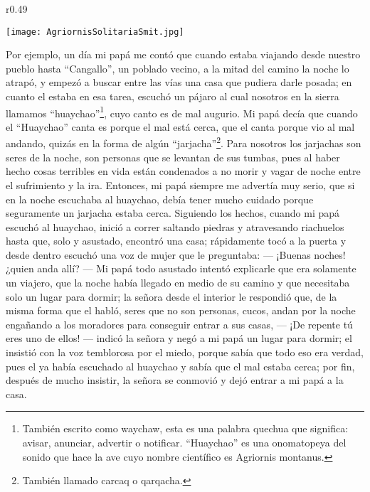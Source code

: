 \ifdefined\EnableIncludeImages
\begin{wrapfigure}{r}{0.49\textwidth}
  \begin{center}
  \vspace{-20pt}
    \texttt{[image: AgriornisSolitariaSmit.jpg]}
  \end{center}
  \vspace{-20pt}
\end{wrapfigure}
\fi
Por ejemplo, un día mi papá me contó que cuando estaba viajando desde nuestro pueblo hasta ``Cangallo'', un poblado vecino, a la mitad del camino la noche lo atrapó, y empezó a buscar entre las vías una casa que pudiera darle posada; en cuanto el estaba en esa tarea, escuchó un pájaro al cual nosotros en la sierra llamamos ``huaychao''\footnote{También escrito como waychaw, esta es una palabra quechua que significa: avisar, anunciar, advertir o notificar. ``Huaychao'' es una onomatopeya del sonido que hace la ave cuyo nombre científico es Agriornis montanus.}, cuyo canto es de mal augurio.
Mi papá decía que cuando el ``Huaychao'' canta es porque el mal está cerca, que el canta porque vio al mal andando, quizás en la forma de algún ``jarjacha''\footnote{También llamado carcaq o qarqacha.}. Para nosotros los jarjachas son seres de la noche, son personas que se levantan de sus tumbas, pues al haber hecho cosas terribles en vida están condenados a no morir y vagar de noche entre el sufrimiento y la ira.
Entonces, mi papá siempre me advertía muy serio, que si en la noche escuchaba al huaychao, debía tener mucho cuidado porque seguramente un jarjacha estaba cerca.
Siguiendo los hechos, cuando mi papá escuchó al huaychao, inició a correr saltando piedras y atravesando riachuelos hasta que, solo y asustado, encontró una casa; rápidamente tocó a la puerta y desde dentro escuchó una voz de mujer que le preguntaba: 
--- ¡Buenas noches! ¿quien anda allí? ---
Mi papá todo asustado intentó explicarle que era solamente un viajero, que la noche había llegado en medio de su camino y que necesitaba solo un lugar para dormir; la señora desde el interior le respondió que, de la misma forma que el habló, seres que no son personas, cucos, andan por la noche engañando a los moradores para conseguir entrar a sus casas, 
--- ¡De repente tú eres uno de ellos! --- indicó la señora y negó a mi papá un lugar para dormir; el insistió con la voz temblorosa por el miedo, porque sabía que todo eso era verdad, pues el ya había escuchado al huaychao y sabía que el mal estaba cerca; por fin, después de mucho insistir, la señora se conmovió y dejó entrar a mi papá a la casa.
